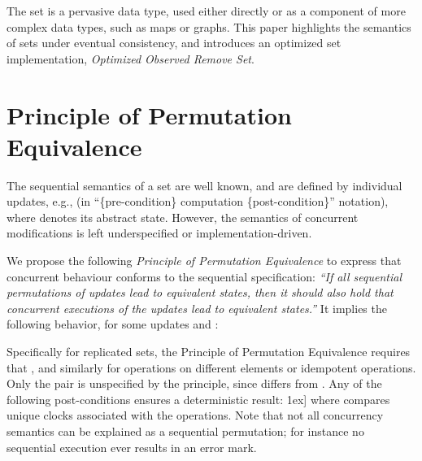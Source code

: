 \documentclass[a4paper]{article}
\begin{document}
The set is a pervasive data type, used either directly or as a component of
more complex data types, such as maps or graphs.  
This paper highlights the semantics of sets under eventual consistency, and
introduces an optimized set implementation, \emph{Optimized Observed Remove
Set}.










\section{Principle of Permutation Equivalence}
\label{sec:permutation-eq}

The sequential semantics of a set are well known, and are defined by
individual updates, e.g.,  (in
``\{pre-condition\} computation \{post-condition\}'' notation), where
 denotes its abstract state.
However, the semantics of concurrent modifications is left underspecified or implementation-driven.








We propose the following \emph{Principle of Permutation Equivalence}
\cite{BZPSBBD12} 
to express that concurrent behaviour conforms to the
sequential specification:
\emph{``If all sequential permutations of updates lead to equivalent states,
then it should also hold that concurrent executions of the updates lead to
equivalent states.'' }
It implies the following behavior, for some updates  and : 



















Specifically for replicated sets, the Principle of Permutation Equivalence requires that 
 , and similarly for operations on different elements or idempotent operations.
Only the pair  is unspecified by the
principle, since  differs from .
Any of the following post-conditions ensures a deterministic result:
{\small  }\-1ex]
where  compares unique clocks associated with the
operations.
Note that not all concurrency semantics can be explained as a sequential
permutation; for instance no sequential execution ever results in an
error mark.
\end{document}
